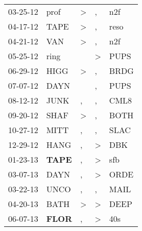 \begin{supertabular}{p{0.07\textwidth}p{0.06\textwidth}p{0.02\textwidth}p{0.02\textwidth}p{0.06\textwidth}}
 03-25-12\textsuperscript{} &           prof\textsuperscript{} &  \textgreater &             , &            n2f\textsuperscript{} \\
 04-17-12\textsuperscript{} &           TAPE\textsuperscript{} &  \textgreater &             , &           reso\textsuperscript{} \\
 04-21-12\textsuperscript{} &            VAN\textsuperscript{} &  \textgreater &             , &            n2f\textsuperscript{} \\
 05-25-12\textsuperscript{} &           ring\textsuperscript{} &               &  \textgreater &           PUPS\textsuperscript{} \\
 06-29-12\textsuperscript{} &           HIGG\textsuperscript{} &  \textgreater &             , &           BRDG\textsuperscript{} \\
 07-07-12\textsuperscript{} &           DAYN\textsuperscript{} &               &             , &           PUPS\textsuperscript{} \\
 08-12-12\textsuperscript{} &           JUNK\textsuperscript{} &             , &             , &           CML8\textsuperscript{} \\
 09-20-12\textsuperscript{} &           SHAF\textsuperscript{} &  \textgreater &             , &           BOTH\textsuperscript{} \\
 10-27-12\textsuperscript{} &           MITT\textsuperscript{} &             , &             , &           SLAC\textsuperscript{} \\
 12-29-12\textsuperscript{} &           HANG\textsuperscript{} &             , &  \textgreater &            DBK\textsuperscript{} \\
 01-23-13\textsuperscript{} &  \textbf{TAPE\textsuperscript{}} &             , &  \textgreater &            sfb\textsuperscript{} \\
 03-07-13\textsuperscript{} &           DAYN\textsuperscript{} &             , &  \textgreater &           ORDE\textsuperscript{} \\
 03-22-13\textsuperscript{} &           UNCO\textsuperscript{} &             , &             , &           MAIL\textsuperscript{} \\
 04-20-13\textsuperscript{} &           BATH\textsuperscript{} &  \textgreater &  \textgreater &           DEEP\textsuperscript{} \\
 06-07-13\textsuperscript{} &  \textbf{FLOR\textsuperscript{}} &             , &  \textgreater &            40s\textsuperscript{} \\

\end{supertabular}
